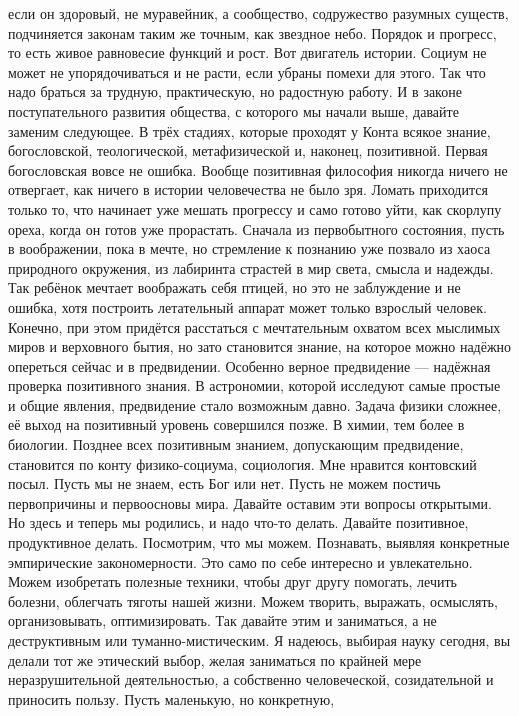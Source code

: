 если он здоровый, не муравейник, а сообщество, содружество разумных существ,
подчиняется законам таким же точным, как звездное небо. Порядок и прогресс, то
есть живое равновесие функций и рост. Вот двигатель истории. Социум не может не
упорядочиваться и не расти, если убраны помехи для этого. Так что надо браться
за трудную, практическую, но радостную работу. И в законе поступательного
развития общества, с которого мы начали выше, давайте заменим следующее. В трёх
стадиях, которые проходят у Конта всякое знание, богословской, теологической,
метафизической и, наконец, позитивной. Первая богословская вовсе не ошибка.
Вообще позитивная философия никогда ничего не отвергает, как ничего в истории
человечества не было зря. Ломать приходится только то, что начинает уже мешать
прогрессу и само готово уйти, как скорлупу ореха, когда он готов уже прорастать.
Сначала из первобытного состояния, пусть в воображении, пока в мечте, но
стремление к познанию уже позвало из хаоса природного окружения, из лабиринта
страстей в мир света, смысла и надежды. Так ребёнок мечтает воображать себя
птицей, но это не заблуждение и не ошибка, хотя построить летательный аппарат
может только взрослый человек. Конечно, при этом придётся расстаться с
мечтательным охватом всех мыслимых миров и верховного бытия, но зато становится
знание, на которое можно надёжно опереться сейчас и в предвидении. Особенно
верное предвидение — надёжная проверка позитивного знания. В астрономии, которой
исследуют самые простые и общие явления, предвидение стало возможным давно.
Задача физики сложнее, её выход на позитивный уровень совершился позже. В химии,
тем более в биологии. Позднее всех позитивным знанием, допускающим предвидение,
становится по конту физико-социума, социология. Мне нравится контовский посыл.
Пусть мы не знаем, есть Бог или нет. Пусть не можем постичь первопричины и
первоосновы мира. Давайте оставим эти вопросы открытыми. Но здесь и теперь мы
родились, и надо что-то делать. Давайте позитивное, продуктивное делать.
Посмотрим, что мы можем. Познавать, выявляя конкретные эмпирические
закономерности. Это само по себе интересно и увлекательно. Можем изобретать
полезные техники, чтобы друг другу помогать, лечить болезни, облегчать тяготы
нашей жизни. Можем творить, выражать, осмыслять, организовывать, оптимизировать.
Так давайте этим и заниматься, а не деструктивным или туманно-мистическим. Я
надеюсь, выбирая науку сегодня, вы делали тот же этический выбор, желая
заниматься по крайней мере неразрушительной деятельностью, а собственно
человеческой, созидательной и приносить пользу. Пусть маленькую, но конкретную,
